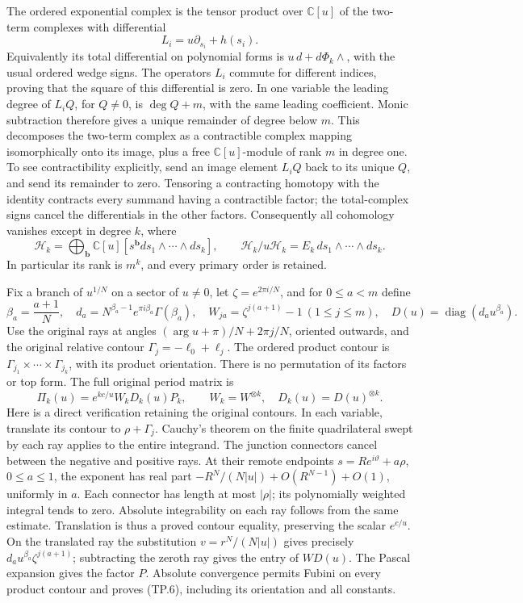 The ordered exponential complex is the tensor product over
\(\mathbb C[u]\) of the two-term complexes with differential
\[
 L_i=u\partial_{s_i}+h(s_i).
 \tag{TP.3}\label{eq:tp-differential}
\]
Equivalently its total differential on polynomial forms is
\(u\,d+d\Phi_k\wedge\), with the usual ordered wedge signs.
The operators \(L_i\) commute for different indices, proving that
the square of this differential is zero. In one variable the leading
degree of \(L_iQ\), for \(Q\ne0\), is \(\deg Q+m\), with the
same leading coefficient. Monic subtraction therefore gives a unique
remainder of degree below \(m\). This decomposes the two-term complex
as a contractible complex mapping isomorphically onto its image,
plus a free \(\mathbb C[u]\)-module of rank \(m\) in degree one.
To see contractibility explicitly, send an image element \(L_iQ\)
back to its unique \(Q\), and send its remainder to zero.
Tensoring a contracting homotopy with the identity contracts every
summand having a contractible factor; the total-complex signs cancel
the differentials in the other factors. Consequently all cohomology
vanishes except in degree \(k\), where
\[
 \mathcal H_k=\bigoplus_{\mathbf b}\mathbb C[u]
          [s^{\mathbf b}ds_1\wedge\cdots\wedge ds_k],
 \qquad \mathcal H_k/u\mathcal H_k=E_k\,ds_1\wedge\cdots\wedge ds_k.
 \tag{TP.4}\label{eq:tp-lattice}
\]
In particular its rank is \(m^k\), and every primary order is retained.

Fix a branch of \(u^{1/N}\) on a sector of \(u\ne0\), let
\(\zeta=e^{2\pi i/N}\), and for \(0\leq a<m\) define
\[
 \beta_a=\frac{a+1}{N},\quad
 d_a=N^{\beta_a-1}e^{\pi i\beta_a}\Gamma(\beta_a),\quad
 W_{ja}=\zeta^{j(a+1)}-1\ (1\leq j\leq m),\quad
 D(u)=\operatorname{diag}(d_a u^{\beta_a}).
 \tag{TP.5}\label{eq:tp-constants}
\]
Use the original rays at angles
\((\arg u+\pi)/N+2\pi j/N\), oriented outwards, and the original
relative contour \(\Gamma_j=-\ell_0+\ell_j\).
The ordered product contour is
\(\Gamma_{j_1}\times\cdots\times\Gamma_{j_k}\), with its product
orientation. There is no permutation of its factors or top form.
The full original period matrix is
\[
 \Pi_k(u)=e^{kc/u}W_kD_k(u)P_k,\qquad
 W_k=W^{\otimes k},\quad D_k(u)=D(u)^{\otimes k}.
 \tag{TP.6}\label{eq:tp-period}
\]
Here is a direct verification retaining the original contours.
In each variable, translate its contour to \(\rho+\Gamma_j\).
Cauchy's theorem on the finite quadrilateral swept by each ray
applies to the entire integrand. The junction connectors cancel
between the negative and positive rays. At their remote endpoints
\(s=Re^{i\vartheta}+a\rho\), \(0\leq a\leq1\), the exponent has
real part \(-R^N/(N|u|)+O(R^{N-1})+O(1)\), uniformly in \(a\).
Each connector has length at most \(|\rho|\); its polynomially
weighted integral tends to zero. Absolute integrability on each
ray follows from the same estimate. Translation is thus a proved
contour equality, preserving the scalar \(e^{c/u}\).
On the translated ray the substitution
\(v=r^N/(N|u|)\) gives precisely
\(d_a u^{\beta_a}\zeta^{j(a+1)}\); subtracting the zeroth ray gives
the entry of \(WD(u)\). The Pascal expansion gives the factor \(P\).
Absolute convergence permits Fubini on every product contour and
proves (TP.6), including its orientation and all constants.

